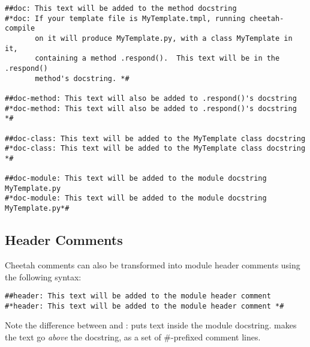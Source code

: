 \begin{verbatim}
##doc: This text will be added to the method docstring
#*doc: If your template file is MyTemplate.tmpl, running cheetah-compile
       on it will produce MyTemplate.py, with a class MyTemplate in it,
       containing a method .respond().  This text will be in the .respond()
       method's docstring. *#

##doc-method: This text will also be added to .respond()'s docstring
#*doc-method: This text will also be added to .respond()'s docstring *#

##doc-class: This text will be added to the MyTemplate class docstring
#*doc-class: This text will be added to the MyTemplate class docstring *#

##doc-module: This text will be added to the module docstring MyTemplate.py
#*doc-module: This text will be added to the module docstring MyTemplate.py*#
\end{verbatim}

\subsection{Header Comments}
\label{directives.comments.headers}
Cheetah comments can also be transformed into module header comments using the
following syntax:

\begin{verbatim}
##header: This text will be added to the module header comment
#*header: This text will be added to the module header comment *#
\end{verbatim}

Note the difference between  and :
 puts  text inside the module docstring.   makes the text go {\em above} the docstring, as a
set of \#-prefixed comment lines.

